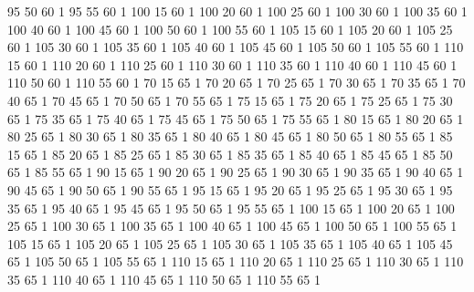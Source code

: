 	95	50	60	1
	95	55	60	1
	100	15	60	1
	100	20	60	1
	100	25	60	1
	100	30	60	1
	100	35	60	1
	100	40	60	1
	100	45	60	1
	100	50	60	1
	100	55	60	1
	105	15	60	1
	105	20	60	1
	105	25	60	1
	105	30	60	1
	105	35	60	1
	105	40	60	1
	105	45	60	1
	105	50	60	1
	105	55	60	1
	110	15	60	1
	110	20	60	1
	110	25	60	1
	110	30	60	1
	110	35	60	1
	110	40	60	1
	110	45	60	1
	110	50	60	1
	110	55	60	1
	70	15	65	1
	70	20	65	1
	70	25	65	1
	70	30	65	1
	70	35	65	1
	70	40	65	1
	70	45	65	1
	70	50	65	1
	70	55	65	1
	75	15	65	1
	75	20	65	1
	75	25	65	1
	75	30	65	1
	75	35	65	1
	75	40	65	1
	75	45	65	1
	75	50	65	1
	75	55	65	1
	80	15	65	1
	80	20	65	1
	80	25	65	1
	80	30	65	1
	80	35	65	1
	80	40	65	1
	80	45	65	1
	80	50	65	1
	80	55	65	1
	85	15	65	1
	85	20	65	1
	85	25	65	1
	85	30	65	1
	85	35	65	1
	85	40	65	1
	85	45	65	1
	85	50	65	1
	85	55	65	1
	90	15	65	1
	90	20	65	1
	90	25	65	1
	90	30	65	1
	90	35	65	1
	90	40	65	1
	90	45	65	1
	90	50	65	1
	90	55	65	1
	95	15	65	1
	95	20	65	1
	95	25	65	1
	95	30	65	1
	95	35	65	1
	95	40	65	1
	95	45	65	1
	95	50	65	1
	95	55	65	1
	100	15	65	1
	100	20	65	1
	100	25	65	1
	100	30	65	1
	100	35	65	1
	100	40	65	1
	100	45	65	1
	100	50	65	1
	100	55	65	1
	105	15	65	1
	105	20	65	1
	105	25	65	1
	105	30	65	1
	105	35	65	1
	105	40	65	1
	105	45	65	1
	105	50	65	1
	105	55	65	1
	110	15	65	1
	110	20	65	1
	110	25	65	1
	110	30	65	1
	110	35	65	1
	110	40	65	1
	110	45	65	1
	110	50	65	1
	110	55	65	1
				
				
				
				
				
